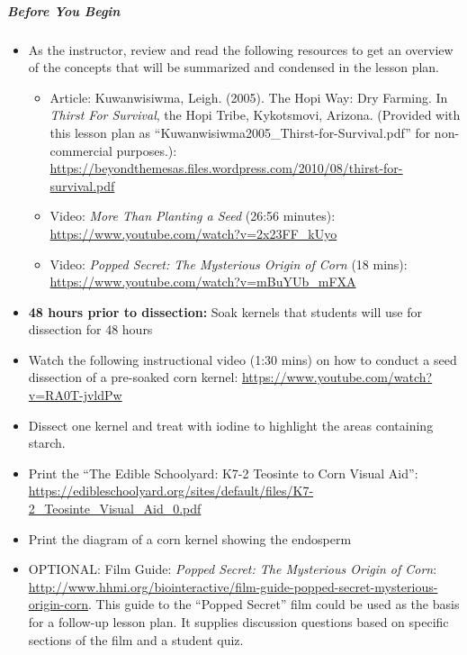 \documentclass[12pt,]{article}
\providecommand{\tightlist}{%
  \setlength{\itemsep}{0pt}\setlength{\parskip}{0pt}}
\let\oldsubparagraph\subparagraph
\renewcommand{\subparagraph}[1]{\oldsubparagraph{#1}\mbox{}}
\begin{document}
\hypertarget{before-you-begin-2}{%
\subparagraph{Before You Begin}\label{before-you-begin-2}}

\begin{itemize}
\tightlist
\item
  As the instructor, review and read the following resources to get an overview of the concepts that will be summarized and condensed in the lesson plan.

  \begin{itemize}
  \tightlist
  \item
    Article: Kuwanwisiwma, Leigh. (2005). The Hopi Way: Dry Farming. In \emph{Thirst For Survival}, the Hopi Tribe, Kykotsmovi, Arizona. (Provided with this lesson plan as ``Kuwanwisiwma2005\_Thirst-for-Survival.pdf'' for non-commercial purposes.): \url{https://beyondthemesas.files.wordpress.com/2010/08/thirst-for-survival.pdf}
  \item
    Video: \emph{More Than Planting a Seed} (26:56 minutes): \url{https://www.youtube.com/watch?v=2x23FF_kUyo}
  \item
    Video: \emph{Popped Secret: The Mysterious Origin of Corn} (18 mins): \url{https://www.youtube.com/watch?v=mBuYUb_mFXA}
  \end{itemize}
\item
  \textbf{48 hours prior to dissection: }Soak kernels that students will use for dissection for 48 hours
\item
  Watch the following instructional video (1:30 mins) on how to conduct a seed dissection of a pre-soaked corn kernel: \url{https://www.youtube.com/watch?v=RA0T-jvldPw}
\item
  Dissect one kernel and treat with iodine to highlight the areas containing starch.
\item
  Print the ``The Edible Schoolyard: K7-2 Teosinte to Corn Visual Aid'': \url{https://edibleschoolyard.org/sites/default/files/K7-2_Teosinte_Visual_Aid_0.pdf}
\item
  Print the diagram of a corn kernel showing the endosperm
\item
  OPTIONAL: Film Guide: \emph{Popped Secret: The Mysterious Origin of Corn}: \url{http://www.hhmi.org/biointeractive/film-guide-popped-secret-mysterious-origin-corn}. This guide to the ``Popped Secret'' film could be used as the basis for a follow-up lesson plan. It supplies discussion questions based on specific sections of the film and a student quiz.
\end{itemize}
\end{document}
